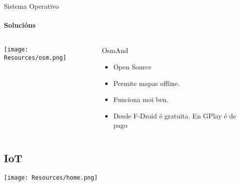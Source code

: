 \documentclass{beamer}
\begin{document}
\begin{frame}{Sistema Operativo}
  \framesubtitle{Solucións}

  \begin{columns}
    \begin{column}{0.5\textwidth}
      \texttt{[image: Resources/osm.png]}


    \end{column}

    \begin{column}{0.4\textwidth}
      \begin{block}{OsmAnd}
        \begin{itemize}
          \item Open Source
          \item Permite mapas offline.
          \item Funciona moi ben.
          \item Desde F-Droid é gratuita. En GPlay é de pago
        \end{itemize}
      \end{block}

    \end{column}

  \end{columns}

\end{frame}

\subsection{IoT}

\begin{frame}
  \texttt{[image: Resources/home.png]}
\end{frame}
\end{document}
